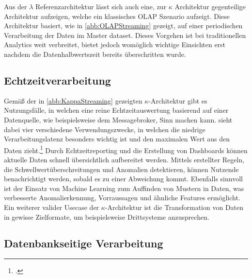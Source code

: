 Aus der $\lambda$ Referenzarchitektur lässt sich auch eine, zur $\kappa$ Architektur gegenteilige Architektur aufzeigen, welche ein klassisches \ac{OLAP} Szenario aufzeigt.  Diese Architektur basiert, wie in \autoref{abb:OLAPStreaming} gezeigt, auf einer periodischen Verarbeitung der Daten im Master dataset. Dieses Vorgehen ist bei traditionellen Analytics weit verbreitet, bietet jedoch womöglich wichtige Einsichten erst nachdem die Datenhalbwertszeit bereits überschritten wurde.



\subsection{Echtzeitverarbeitung}
Gemäß der in \autoref{abb:KappaStreaming} gezeigten $\kappa$-Architektur gibt es Nutzungsfälle, in welchen eine reine Echtzeitauswertung basierend auf einer Datenquelle, wie beispielsweise dem Messagebroker, Sinn machen kann. \citeauthor{Belur.2020} sieht dabei vier verschiedene Verwendungszwecke, in welchen die niedrige Verarbeitungslatenz besonders wichtig ist und den maximalen Wert aus den Daten zieht.\footcite[Vgl. auch im Folgenden][]{Belur.2020} Durch Echtzeitreporting und die Erstellung von Dashboards können aktuelle Daten schnell übersichtlich aufbereitet werden. Mittels erstellter Regeln, die Schwellwertüberschreitungen und Anomalien detektieren, können Nutzende benachrichtigt werden, sobald es zu einer Abweichung kommt. Ebenfalls sinnvoll ist der Einsatz von Machine Learning zum Auffinden von Mustern in Daten, was verbesserte Anomalierkennung, Vorraussagen und ähnliche Features ermöglicht. Ein weiterer valider Usecase der $\kappa$-Architektur ist die Transformation von Daten in gewisse Zielformate, um beispielsweise Drittsysteme anzusprechen.



\subsection{Datenbankseitige Verarbeitung}

